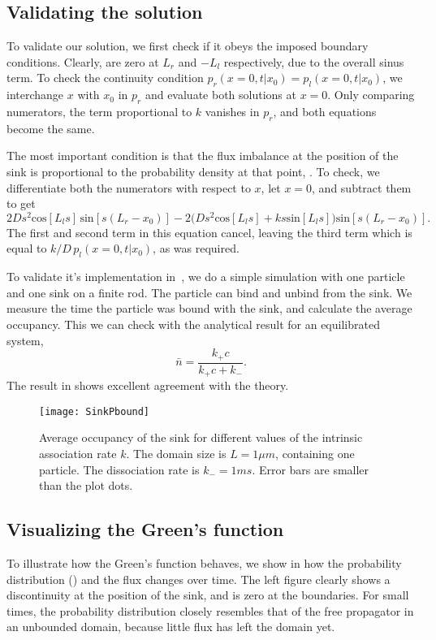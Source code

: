 \subsection{Validating the solution}
To validate our solution, we first check if it obeys the imposed boundary conditions. Clearly,  are zero at $L_r$ and $-L_l$ respectively, due to the overall sinus term. To check the continuity condition $p_r(x=0,t|x_0)=p_l(x=0,t|x_0)$, we interchange $x$ with $x_0$ in $p_r$ and evaluate both solutions at $x=0$. Only comparing numerators, the term proportional to $k$ vanishes in $p_r$, and both equations become the same. 

The most important condition is that the flux imbalance at the position of the sink is proportional to the probability density at that point, . To check, we differentiate both the numerators with respect to $x$, let $x=0$, and subtract them to get
\begin{equation}
 2 D s^2 \mathrm{cos}[L_l s] \, \mathrm{sin}[s (L_r-x_0)]-2 \Big(D s^2 \mathrm{cos}[L_l s]+k s \mathrm{sin}[L_l s]\Big) \mathrm{sin}[s (L_r-x_0)].
\end{equation}
The first and second term in this equation cancel, leaving the third term which is equal to $k/D \, p_l(x=0,t|x_0)$, as was required. 

To validate it's implementation in \GFRD\,, we do a simple simulation with one particle and one sink on a finite rod. The particle can bind and unbind from the sink. We measure the time the particle was bound with the sink, and calculate the average occupancy. This we can check with the analytical result for an equilibrated system,
\begin{equation}
\bar{n} = \frac{k_+ c}{k_+ c + k_-}.
\end{equation}
The result in  shows excellent agreement with the theory.

\begin{figure}[th]
\centering
\texttt{[image: SinkPbound]}
\caption{ Average occupancy of the sink for different values of the intrinsic association rate $k$. The domain size is $L=1\mu m$, containing one particle. The dissociation rate is $k_-=1ms$. Error bars are smaller than the plot dots.}
\end{figure}

\subsection{Visualizing the Green's function}
To illustrate how the Green's function behaves, we show in  how the probability distribution () and the flux changes over time. The left figure clearly shows a discontinuity at the position of the sink, and is zero at the boundaries. For small times, the probability distribution closely resembles that of the free propagator in an unbounded domain, because little flux has left the domain yet.

